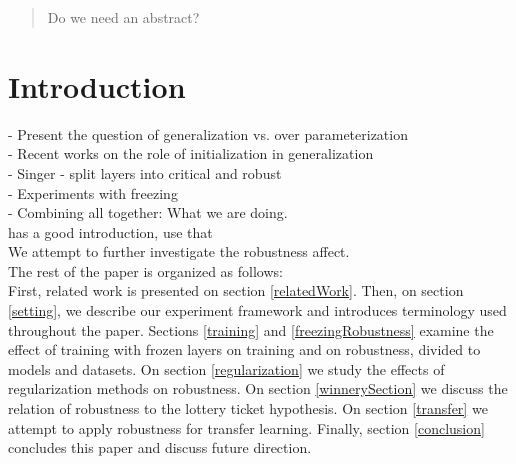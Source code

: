 \documentclass{article}
\begin{document}

\begin{abstract}
Do we need an abstract?
\end{abstract}
\section{Introduction}
 - Present the question of generalization vs. over parameterization\\
 - Recent works on the role of initialization in generalization\\
 - Singer - split layers into critical and robust\\
 - Experiments with freezing\\
 - Combining all together: What we are doing.\\
 \cite{learningNothing} has a good introduction, use that\\
We attempt to further investigate the robustness affect.\\
 The rest of the paper is organized as follows:\\
First, related work is presented on section \ref{relatedWork}. Then, on section \ref{setting}, we describe our experiment framework and introduces terminology used throughout the paper. Sections \ref{training} and \ref{freezingRobustness} examine the effect of training with frozen layers on training and on robustness, divided to models and datasets. On section \ref{regularization} we study the effects of regularization methods on robustness. On section \ref{winnerySection} we discuss the relation of robustness to the lottery ticket hypothesis. On section \ref{transfer} we attempt to apply robustness for transfer learning. Finally, section \ref{conclusion} concludes this paper and discuss future direction.  
\end{document}
